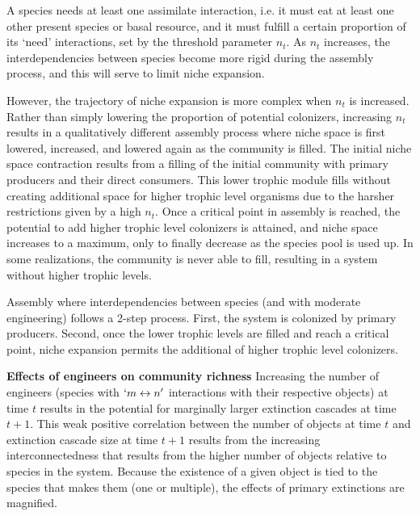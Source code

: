 \documentclass[twocolumn,preprintnumbers,amsmath,amssymb,superscriptaddress]{revtex4}
\begin{document}
A species needs at least one assimilate interaction, i.e. it must eat at least one other present species or basal resource, and it must fulfill a certain proportion of its `need' interactions, set by the threshold parameter $n_t$.
As $n_t$ increases, the interdependencies between species become more rigid during the assembly process, and this will serve to limit niche expansion.

However, the trajectory of niche expansion is more complex when $n_t$ is increased.
Rather than simply lowering the proportion of potential colonizers, increasing $n_t$ results in a qualitatively different assembly process where niche space is first lowered, increased, and lowered again as the community is filled.
The initial niche space contraction results from a filling of the initial community with primary producers and their direct consumers.
This lower trophic module fills without creating additional space for higher trophic level organisms due to the harsher restrictions given by a high $n_t$.
Once a critical point in assembly is reached, the potential to add higher trophic level colonizers is attained, and niche space increases to a maximum, only to finally decrease as the species pool is used up.
In some realizations, the community is never able to fill, resulting in a system without higher trophic levels.

Assembly where interdependencies between species (and with moderate engineering) follows a 2-step process.
First, the system is colonized by primary producers.
Second, once the lower trophic levels are filled and reach a critical point, niche expansion permits the additional of higher trophic level colonizers.








{\bf Effects of engineers on community richness}
Increasing the number of engineers (species with $ `m \leftrightarrow n'$ interactions with their respective objects) at time $t$ results in the potential for marginally larger extinction cascades at time $t+1$.
This weak positive correlation between the number of objects at time $t$ and extinction cascade size at time $t+1$ results from the increasing interconnectedness that results from the higher number of objects relative to species in the system.
Because the existence of a given object is tied to the species that makes them (one or multiple), the effects of primary extinctions are magnified.
\end{document}
